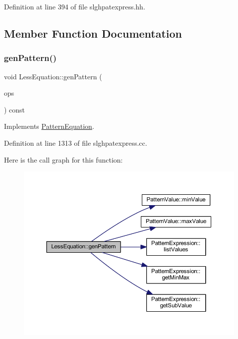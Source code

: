 Definition at line 394 of file slghpatexpress.\+hh.



\subsection{Member Function Documentation}
\mbox{\label{class_less_equation_a6bc8fcb6385a1804b80b0329b26ef4b0}} 
\subsubsection{\texorpdfstring{genPattern()}{genPattern()}}
{\footnotesize\ttfamily void Less\+Equation\+::gen\+Pattern (\begin{DoxyParamCaption}\item[{const vector$<$ \mbox{\hyperlink{class_token_pattern}{Token\+Pattern}} $>$ \&}]{ops }\end{DoxyParamCaption}) const\hspace{0.3cm}{\ttfamily [virtual]}}



Implements \mbox{\hyperlink{class_pattern_equation_a9838e5bfe5b6013c99567628a6364bfd}{Pattern\+Equation}}.



Definition at line 1313 of file slghpatexpress.\+cc.

Here is the call graph for this function\+:
\nopagebreak
\begin{figure}[H]
\begin{center}
\leavevmode
\includegraphics[width=350pt]{class_less_equation_a6bc8fcb6385a1804b80b0329b26ef4b0_cgraph}
\end{center}
\end{figure}


